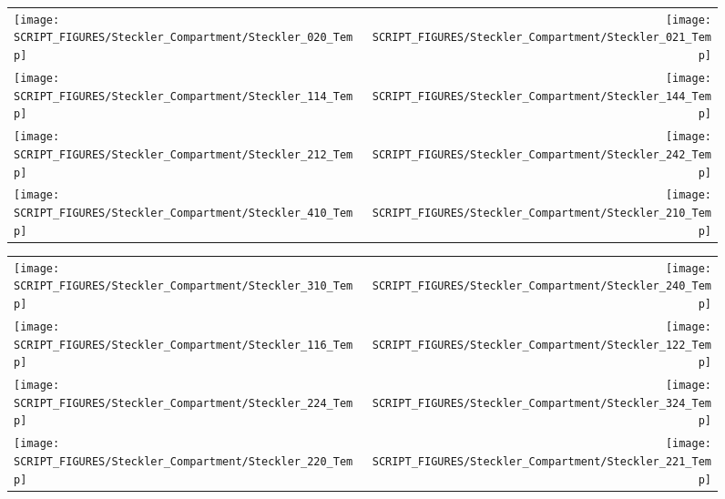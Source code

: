\begin{figure}[p]
\begin{tabular*}{\textwidth}{l@{\extracolsep{\fill}}r}
\texttt{[image: SCRIPT\_FIGURES/Steckler\_Compartment/Steckler\_020\_Temp]} &
\texttt{[image: SCRIPT\_FIGURES/Steckler\_Compartment/Steckler\_021\_Temp]} \\
\texttt{[image: SCRIPT\_FIGURES/Steckler\_Compartment/Steckler\_114\_Temp]} &
\texttt{[image: SCRIPT\_FIGURES/Steckler\_Compartment/Steckler\_144\_Temp]} \\
\texttt{[image: SCRIPT\_FIGURES/Steckler\_Compartment/Steckler\_212\_Temp]} &
\texttt{[image: SCRIPT\_FIGURES/Steckler\_Compartment/Steckler\_242\_Temp]} \\
\texttt{[image: SCRIPT\_FIGURES/Steckler\_Compartment/Steckler\_410\_Temp]} &
\texttt{[image: SCRIPT\_FIGURES/Steckler\_Compartment/Steckler\_210\_Temp]}
\end{tabular*}
\label{Steckler_Temp_3}
\end{figure}

\begin{figure}[p]
\begin{tabular*}{\textwidth}{l@{\extracolsep{\fill}}r}
\texttt{[image: SCRIPT\_FIGURES/Steckler\_Compartment/Steckler\_310\_Temp]} &
\texttt{[image: SCRIPT\_FIGURES/Steckler\_Compartment/Steckler\_240\_Temp]} \\
\texttt{[image: SCRIPT\_FIGURES/Steckler\_Compartment/Steckler\_116\_Temp]} &
\texttt{[image: SCRIPT\_FIGURES/Steckler\_Compartment/Steckler\_122\_Temp]} \\
\texttt{[image: SCRIPT\_FIGURES/Steckler\_Compartment/Steckler\_224\_Temp]} &
\texttt{[image: SCRIPT\_FIGURES/Steckler\_Compartment/Steckler\_324\_Temp]} \\
\texttt{[image: SCRIPT\_FIGURES/Steckler\_Compartment/Steckler\_220\_Temp]} &
\texttt{[image: SCRIPT\_FIGURES/Steckler\_Compartment/Steckler\_221\_Temp]}
\end{tabular*}
\label{Steckler_Temp_4}
\end{figure}

